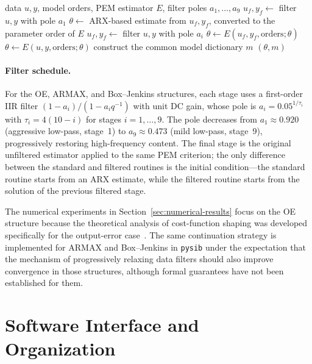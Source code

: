 \documentclass[acmsmall,screen,review]{acmart}
\begin{document}
\begin{algorithm}
\caption{Filtered continuation wrapper}
\label{alg:filtered-continuation}
\begin{algorithmic}[1]
\REQUIRE data \(u,y\), model orders, PEM estimator \(E\), filter poles \(a_1,\ldots,a_9\)
\STATE \(u_f,y_f \leftarrow\) filter \(u,y\) with pole \(a_1\)
\STATE \(\theta \leftarrow\) ARX-based estimate from \(u_f,y_f\), converted to the parameter order of \(E\)
  \STATE \(u_f,y_f \leftarrow\) filter \(u,y\) with pole \(a_i\)
  \STATE \(\theta \leftarrow E(u_f,y_f,\mathrm{orders};\theta)\)
\ENDFOR
\STATE \(\theta \leftarrow E(u,y,\mathrm{orders};\theta)\)
\STATE construct the common model dictionary \(m\)
\STATE \RETURN \((\theta,m)\)
\end{algorithmic}
\end{algorithm}

\paragraph{Filter schedule.}
For the OE, ARMAX, and Box--Jenkins structures, each stage uses a first-order IIR filter
$(1-a_i)/(1 - a_i q^{-1})$ with unit DC gain, whose pole is
$a_i = 0.05^{1/\tau_i}$ with $\tau_i = 4(10 - i)$ for stages
$i = 1,\ldots,9$.  The pole decreases from $a_1 \approx 0.920$
(aggressive low-pass, stage~1) to $a_9 \approx 0.473$ (mild
low-pass, stage~9), progressively restoring high-frequency content.
The final stage is the original unfiltered
estimator applied to the same PEM criterion; the only difference
between the standard and filtered routines is the initial
condition---the standard routine starts from an ARX estimate,
while the filtered routine starts from the solution of the
previous filtered stage.

The numerical experiments in
Section~\ref{sec:numerical-results} focus on the OE structure because
the theoretical analysis of cost-function shaping was developed
specifically for the output-error
case~\cite{eckhard2013input,eckhard2017cost}.
The same continuation strategy is implemented for ARMAX and
Box--Jenkins in \texttt{pysib} under the expectation that the mechanism
of progressively relaxing data filters should also improve convergence
in those structures, although formal guarantees have not been
established for them.

\section{Software Interface and Organization}
\label{sec:software-organization}
\end{document}

